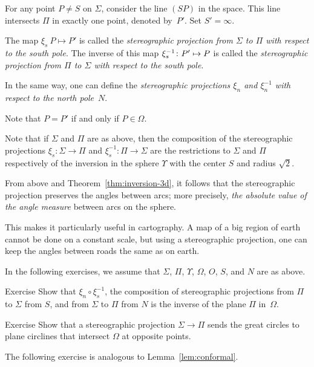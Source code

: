 For any point $P\ne S$ on $\Sigma$,
consider the line $(SP)$ in the space. 
This line intersects $\Pi$ in exactly one point, denoted by~$P'$. 
Set $S'=\infty$.


The map $\xi_s\: P\mapsto P'$ is called the \emph{stereographic projection from $\Sigma$ to $\Pi$ with respect to the south pole}.
The inverse of this map $\xi^{-1}_s\: P'\z\mapsto P$ is called the {}\emph{stereographic projection from $\Pi$ to $\Sigma$ with respect to the south pole}.

In the same way, one can define the
{}\emph{stereographic projections $\xi_n$ and $\xi^{-1}_n$ with respect to the north pole}~$N$.

Note that $P=P'$ if and only if $P\in\Omega$.


Note that if $\Sigma$ and $\Pi$ are as above,
then the composition of the stereographic projections 
$\xi_s: \Sigma\to\Pi$ and  $\xi^{-1}_s: \Pi\to\Sigma$
are the restrictions to $\Sigma$ and $\Pi$ respectively of the inversion in the sphere $\Upsilon$ with the center $S$ and radius $\sqrt{2}$.


From above and Theorem~\ref{thm:inversion-3d},
it follows that the stereographic projection preserves 
the angles between arcs;
more precisely, \textit{the absolute value of the angle measure} between arcs on the sphere.

This makes it particularly useful in cartography.
A map of a big region of earth cannot be done on a constant scale,
but using a stereographic projection, one can keep the angles between roads the same as on earth.

In the following exercises,
we assume that $\Sigma$, $\Pi$, $\Upsilon$, $\Omega$, $O$, $S$, and $N$ are as above.
  
\begin{thm}{Exercise}\label{ex:two-stereographics}
Show that $\xi_n \circ \xi^{-1}_s$, the composition of stereographic projections 
from $\Pi$ to $\Sigma$ from  $S$, and
from $\Sigma$ to $\Pi$ from  $N$ is 
the inverse of the plane $\Pi$ in~$\Omega$.
\end{thm}

\begin{thm}{Exercise}\label{ex:great-circ}
Show that  a stereographic projection $\Sigma\to\Pi$
sends the great circles to plane circlines that intersect $\Omega$ at opposite points.
\end{thm}

The following exercise is analogous to Lemma~\ref{lem:conformal}.

